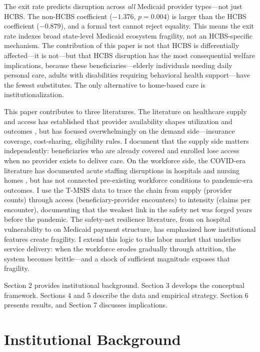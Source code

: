\documentclass[12pt]{article}
\begin{document}
The exit rate predicts disruption across \emph{all} Medicaid provider types---not just HCBS. The non-HCBS coefficient ($-1.376$, $p = 0.004$) is larger than the HCBS coefficient ($-0.879$), and a formal test cannot reject equality. This means the exit rate indexes broad state-level Medicaid ecosystem fragility, not an HCBS-specific mechanism. The contribution of this paper is not that HCBS is differentially affected---it is not---but that HCBS disruption has the most consequential welfare implications, because these beneficiaries---elderly individuals needing daily personal care, adults with disabilities requiring behavioral health support---have the fewest substitutes. The only alternative to home-based care is institutionalization.

This paper contributes to three literatures. The literature on healthcare supply and access has established that provider availability shapes utilization and outcomes \citep{finkelstein2012,baicker2013}, but has focused overwhelmingly on the demand side---insurance coverage, cost-sharing, eligibility rules. I document that the supply side matters independently: beneficiaries who are already covered and enrolled lose access when no provider exists to deliver care. On the workforce side, the COVID-era literature has documented acute staffing disruptions in hospitals \citep{sinsky2021covid} and nursing homes \citep{alexander2020}, but has not connected pre-existing workforce conditions to pandemic-era outcomes. I use the T-MSIS data to trace the chain from supply (provider counts) through access (beneficiary-provider encounters) to intensity (claims per encounter), documenting that the weakest link in the safety net was forged years before the pandemic. The safety-net resilience literature, from \citet{dranove2000} on hospital vulnerability to \citet{duggan2000} on Medicaid payment structure, has emphasized how institutional features create fragility. I extend this logic to the labor market that underlies service delivery: when the workforce erodes gradually through attrition, the system becomes brittle---and a shock of sufficient magnitude exposes that fragility.

Section 2 provides institutional background. Section 3 develops the conceptual framework. Sections 4 and 5 describe the data and empirical strategy. Section 6 presents results, and Section 7 discusses implications.


\section{Institutional Background}
\end{document}
